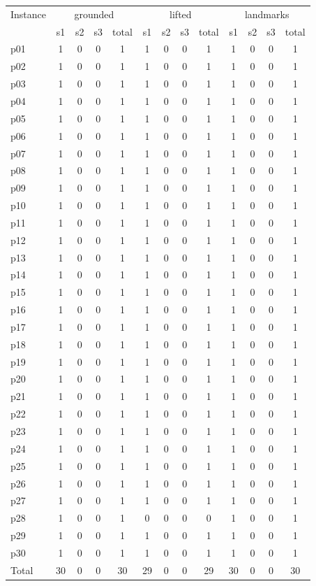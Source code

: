 \begin{tabular}{l|cccc|cccc|cccc}
\hline
Instance & \multicolumn{4}{c}{grounded} & \multicolumn{4}{c}{lifted} & \multicolumn{4}{c}{landmarks} \\
 & s1 & s2 & s3 & total & s1 & s2 & s3 & total & s1 & s2 & s3 & total \\
\hline
p01 & 1 & 0 & 0 & 1 & 1 & 0 & 0 & 1 & 1 & 0 & 0 & 1 \\
p02 & 1 & 0 & 0 & 1 & 1 & 0 & 0 & 1 & 1 & 0 & 0 & 1 \\
p03 & 1 & 0 & 0 & 1 & 1 & 0 & 0 & 1 & 1 & 0 & 0 & 1 \\
p04 & 1 & 0 & 0 & 1 & 1 & 0 & 0 & 1 & 1 & 0 & 0 & 1 \\
p05 & 1 & 0 & 0 & 1 & 1 & 0 & 0 & 1 & 1 & 0 & 0 & 1 \\
p06 & 1 & 0 & 0 & 1 & 1 & 0 & 0 & 1 & 1 & 0 & 0 & 1 \\
p07 & 1 & 0 & 0 & 1 & 1 & 0 & 0 & 1 & 1 & 0 & 0 & 1 \\
p08 & 1 & 0 & 0 & 1 & 1 & 0 & 0 & 1 & 1 & 0 & 0 & 1 \\
p09 & 1 & 0 & 0 & 1 & 1 & 0 & 0 & 1 & 1 & 0 & 0 & 1 \\
p10 & 1 & 0 & 0 & 1 & 1 & 0 & 0 & 1 & 1 & 0 & 0 & 1 \\
p11 & 1 & 0 & 0 & 1 & 1 & 0 & 0 & 1 & 1 & 0 & 0 & 1 \\
p12 & 1 & 0 & 0 & 1 & 1 & 0 & 0 & 1 & 1 & 0 & 0 & 1 \\
p13 & 1 & 0 & 0 & 1 & 1 & 0 & 0 & 1 & 1 & 0 & 0 & 1 \\
p14 & 1 & 0 & 0 & 1 & 1 & 0 & 0 & 1 & 1 & 0 & 0 & 1 \\
p15 & 1 & 0 & 0 & 1 & 1 & 0 & 0 & 1 & 1 & 0 & 0 & 1 \\
p16 & 1 & 0 & 0 & 1 & 1 & 0 & 0 & 1 & 1 & 0 & 0 & 1 \\
p17 & 1 & 0 & 0 & 1 & 1 & 0 & 0 & 1 & 1 & 0 & 0 & 1 \\
p18 & 1 & 0 & 0 & 1 & 1 & 0 & 0 & 1 & 1 & 0 & 0 & 1 \\
p19 & 1 & 0 & 0 & 1 & 1 & 0 & 0 & 1 & 1 & 0 & 0 & 1 \\
p20 & 1 & 0 & 0 & 1 & 1 & 0 & 0 & 1 & 1 & 0 & 0 & 1 \\
p21 & 1 & 0 & 0 & 1 & 1 & 0 & 0 & 1 & 1 & 0 & 0 & 1 \\
p22 & 1 & 0 & 0 & 1 & 1 & 0 & 0 & 1 & 1 & 0 & 0 & 1 \\
p23 & 1 & 0 & 0 & 1 & 1 & 0 & 0 & 1 & 1 & 0 & 0 & 1 \\
p24 & 1 & 0 & 0 & 1 & 1 & 0 & 0 & 1 & 1 & 0 & 0 & 1 \\
p25 & 1 & 0 & 0 & 1 & 1 & 0 & 0 & 1 & 1 & 0 & 0 & 1 \\
p26 & 1 & 0 & 0 & 1 & 1 & 0 & 0 & 1 & 1 & 0 & 0 & 1 \\
p27 & 1 & 0 & 0 & 1 & 1 & 0 & 0 & 1 & 1 & 0 & 0 & 1 \\
p28 & 1 & 0 & 0 & 1 & 0 & 0 & 0 & 0 & 1 & 0 & 0 & 1 \\
p29 & 1 & 0 & 0 & 1 & 1 & 0 & 0 & 1 & 1 & 0 & 0 & 1 \\
p30 & 1 & 0 & 0 & 1 & 1 & 0 & 0 & 1 & 1 & 0 & 0 & 1 \\
\hline
Total & 30 & 0 & 0 & 30 & 29 & 0 & 0 & 29 & 30 & 0 & 0 & 30 \\
\hline
\end{tabular}
